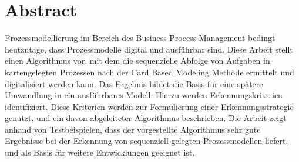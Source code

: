 

\chapter*{Abstract}
\label{cha:abstract}

Prozessmodellierung im Bereich des Business Process Management bedingt heutzutage, dass Prozessmodelle digital und ausführbar sind. Diese Arbeit stellt einen Algorithmus vor, mit dem die sequenzielle Abfolge von Aufgaben in kartengelegten Prozessen nach der Card Based Modeling Methode ermittelt und digitalisiert werden kann. Das Ergebnis bildet die Basis für eine spätere Umwandlung in ein ausführbares Modell. Hierzu werden Erkennungskriterien identifiziert. Diese Kriterien werden zur Formulierung einer Erkennungsstrategie genutzt, und ein davon abgeleiteter Algorithmus beschrieben. Die Arbeit zeigt anhand von Testbeispielen, dass der vorgestellte Algorithmus sehr gute Ergebnisse bei der Erkennung von sequenziell gelegten Prozessmodellen liefert, und als Basis für weitere Entwicklungen geeignet ist.  




